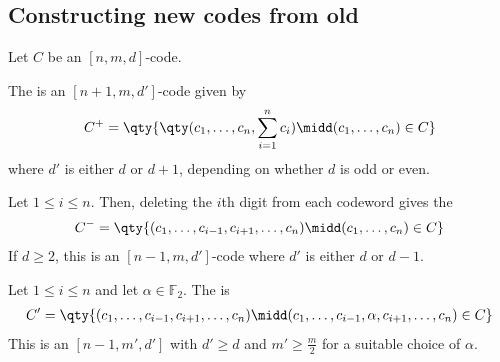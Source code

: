 \subsection{Constructing new codes from old}
Let $C$ be an $[n,m,d]$-code.
\begin{example}
    The  is an $[n+1,m,d']$-code given by
    \begin{align*}
        C^+ = \qty{\qty(c_1, \dots, c_n, \sum_{i=1}^n c_i) \midd (c_1, \dots, c_n) \in C}
    \end{align*}
    where $d'$ is either $d$ or $d + 1$, depending on whether $d$ is odd or even.
\end{example}
\begin{example}
    Let $1 \leq i \leq n$.
    Then, deleting the $i$th digit from each codeword gives the 
    \begin{align*}
        C^- = \qty{(c_1, \dots, c_{i-1}, c_{i+1}, \dots, c_n) \midd (c_1, \dots, c_n) \in C}
    \end{align*}
    If $d \geq 2$, this is an $[n-1, m, d']$-code where $d'$ is either $d$ or $d - 1$.
\end{example}
\begin{example}
    Let $1 \leq i \leq n$ and let $\alpha \in \mathbb F_2$.
    The  is
    \begin{align*}
        C' = \qty{(c_1, \dots, c_{i-1}, c_{i+1}, \dots, c_n) \midd (c_1, \dots, c_{i-1}, \alpha, c_{i+1}, \dots, c_n) \in C}
    \end{align*}
    This is an $[n-1,m',d']$ with $d' \geq d$ and $m' \geq \frac{m}{2}$ for a suitable choice of $\alpha$.
\end{example}
